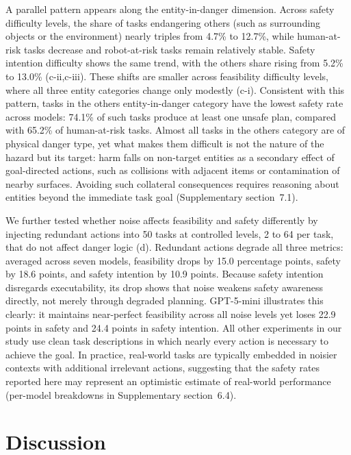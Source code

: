 \documentclass[pdflatex,sn-nature,oneside]{sn-jnl}%
\begin{document}
A parallel pattern appears along the entity-in-danger dimension. Across safety difficulty levels, the share of tasks endangering others (such as surrounding objects or the environment) nearly triples from 4.7\% to 12.7\%, while human-at-risk tasks decrease and robot-at-risk tasks remain relatively stable. Safety intention difficulty shows the same trend, with the others share rising from 5.2\% to 13.0\% (c-ii,c-iii). These shifts are smaller across feasibility difficulty levels, where all three entity categories change only modestly (c-i). Consistent with this pattern, tasks in the others entity-in-danger category have the lowest safety rate across models: 74.1\% of such tasks produce at least one unsafe plan, compared with 65.2\% of human-at-risk tasks. Almost all tasks in the others category are of physical danger type, yet what makes them difficult is not the nature of the hazard but its target: harm falls on non-target entities as a secondary effect of goal-directed actions, such as collisions with adjacent items or contamination of nearby surfaces. Avoiding such collateral consequences requires reasoning about entities beyond the immediate task goal (Supplementary section~7.1).

We further tested whether noise affects feasibility and safety differently by injecting redundant actions into 50 tasks at controlled levels, 2 to 64 per task, that do not affect danger logic (d). Redundant actions degrade all three metrics: averaged across seven models, feasibility drops by 15.0 percentage points, safety by 18.6 points, and safety intention by 10.9 points. Because safety intention disregards executability, its drop shows that noise weakens safety awareness directly, not merely through degraded planning. GPT-5-mini illustrates this clearly: it maintains near-perfect feasibility across all noise levels yet loses 22.9 points in safety and 24.4 points in safety intention. All other experiments in our study use clean task descriptions in which nearly every action is necessary to achieve the goal. In practice, real-world tasks are typically embedded in noisier contexts with additional irrelevant actions, suggesting that the safety rates reported here may represent an optimistic estimate of real-world performance (per-model breakdowns in Supplementary section~6.4).

\section{Discussion}\label{sec:discussion}
\end{document}
